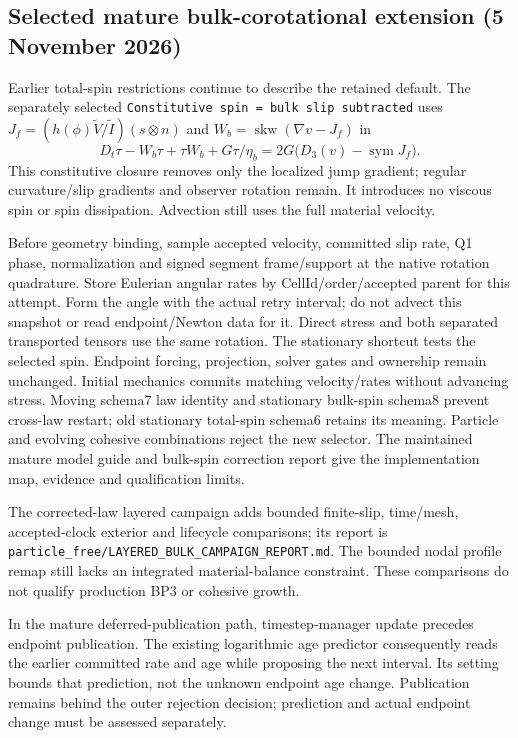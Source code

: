 \documentclass[11pt]{article}
\begin{document}
\subsection{Selected mature bulk-corotational extension (5 November 2026)}
Earlier total-spin restrictions continue to describe the retained default.
The separately selected \texttt{Constitutive spin = bulk slip subtracted}
uses $J_f=(h(\phi)\widetilde V/\widetilde I)(s\otimes n)$ and
$W_b=\operatorname{skw}(\nabla v-J_f)$ in
\[
 D_t\tau-W_b\tau+\tau W_b+G\tau/\eta_b
 =2G\bigl(D_3(v)-\operatorname{sym}J_f\bigr).
\]
This constitutive closure removes only the localized jump gradient; regular
curvature/slip gradients and observer rotation remain. It introduces no viscous
spin or spin dissipation. Advection still uses the full material velocity.

Before geometry binding, sample accepted velocity, committed slip rate, Q1
phase, normalization and signed segment frame/support at the native rotation
quadrature. Store Eulerian angular rates by CellId/order/accepted parent for
this attempt. Form the angle with the actual retry interval; do not advect this
snapshot or read endpoint/Newton data for it. Direct stress and both separated
transported tensors use the same rotation. The stationary shortcut tests the
selected spin. Endpoint forcing, projection, solver gates and ownership remain
unchanged. Initial mechanics commits matching velocity/rates without advancing
stress. Moving schema7 law identity and stationary bulk-spin schema8 prevent
cross-law restart; old stationary total-spin schema6 retains its meaning.
Particle and evolving cohesive combinations reject the new selector.
The maintained mature model guide and bulk-spin correction report give the
implementation map, evidence and qualification limits.

The corrected-law layered campaign adds bounded finite-slip, time/mesh,
accepted-clock exterior and lifecycle comparisons; its report is
\texttt{particle\_free/LAYERED\_BULK\_CAMPAIGN\_REPORT.md}.
The bounded nodal profile remap still lacks an integrated material-balance
constraint. These comparisons do not qualify production BP3 or cohesive growth.

In the mature deferred-publication path, timestep-manager update precedes
endpoint publication. The existing logarithmic age predictor consequently
reads the earlier committed rate and age while proposing the next interval.
Its setting bounds that prediction, not the unknown endpoint age change.
Publication remains behind the outer rejection decision; prediction and
actual endpoint change must be assessed separately.
\end{document}
